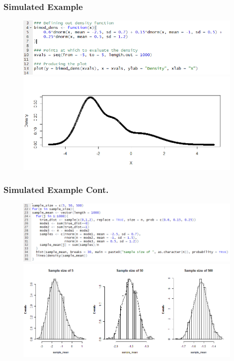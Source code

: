 \documentclass{beamer}
\begin{document}
\begin{frame}
\frametitle{Simulated Example}
\begin{figure}[H]
\centering
\includegraphics[width=11cm]{bimod_dens_gen.png}
\vspace{0.1 cm}
\includegraphics[width=11cm]{bimod_dens_plot.png}
\end{figure}
\end{frame}


\begin{frame}
\frametitle{Simulated Example Cont.}
\begin{figure}[H]
\centering
\includegraphics[width=11cm]{bimod_dens_sim.png}
\vspace{0.1 cm}
\includegraphics[width=11cm]{bimod_dens_hist.png}
\end{figure}
\end{frame}
\end{document}

